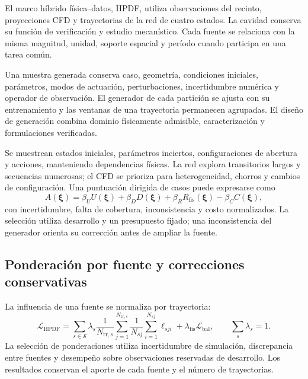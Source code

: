 El marco híbrido física--datos, HPDF, utiliza observaciones del recinto, proyecciones CFD y trayectorias de la red de cuatro estados. La cavidad conserva su función de verificación y estudio mecanístico. Cada fuente se relaciona con la misma magnitud, unidad, soporte espacial y período cuando participa en una tarea común.

Una muestra generada conserva caso, geometría, condiciones iniciales, parámetros, modos de actuación, perturbaciones, incertidumbre numérica y operador de observación. El generador de cada partición se ajusta con su entrenamiento y las ventanas de una trayectoria permanecen agrupadas. El diseño de generación combina dominio físicamente admisible, caracterización y formulaciones verificadas.

Se muestrean estados iniciales, parámetros inciertos, configuraciones de abertura y acciones, manteniendo dependencias físicas. La red explora transitorios largos y secuencias numerosas; el CFD se prioriza para heterogeneidad, chorros y cambios de configuración. Una puntuación dirigida de casos puede expresarse como
\begin{equation}
A(\boldsymbol\xi)=\beta_UU(\boldsymbol\xi)+\beta_DD(\boldsymbol\xi)
+\beta_RR_{\mathrm{fis}}(\boldsymbol\xi)-\beta_CC(\boldsymbol\xi),
\label{met:adquisicion}
\end{equation}
con incertidumbre, falta de cobertura, inconsistencia y costo normalizados. La selección utiliza desarrollo y un presupuesto fijado; una inconsistencia del generador orienta su corrección antes de ampliar la fuente.

\subsection{Ponderación por fuente y correcciones conservativas}

La influencia de una fuente se normaliza por trayectoria:
\begin{equation}
\mathcal L_{\mathrm{HPDF}}=\sum_{s\in\mathcal S}\lambda_s
\frac{1}{N_{\mathrm{tr},s}}\sum_{j=1}^{N_{\mathrm{tr},s}}
\frac{1}{N_{sj}}\sum_{i=1}^{N_{sj}}\ell_{sji}
+\lambda_{\mathrm{fis}}\mathcal L_{\mathrm{bal}},\qquad
\sum_s\lambda_s=1.
\label{met:perdida_hpdf}
\end{equation}
La selección de ponderaciones utiliza incertidumbre de simulación, discrepancia entre fuentes y desempeño sobre observaciones reservadas de desarrollo. Los resultados conservan el aporte de cada fuente y el número de trayectorias.

